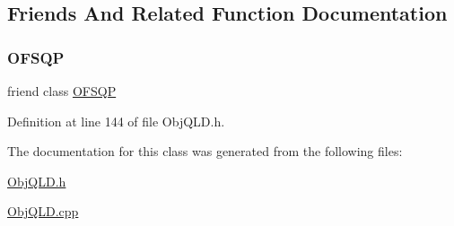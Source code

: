 \subsection{Friends And Related Function Documentation}
\hypertarget{classocra_1_1ObjQLD_a35ebfe61821cfb93672b26cc472c939e}{}\label{classocra_1_1ObjQLD_a35ebfe61821cfb93672b26cc472c939e} 
\subsubsection{\texorpdfstring{O\+F\+S\+QP}{OFSQP}}
{\footnotesize\ttfamily friend class \hyperlink{classocra_1_1OFSQP}{O\+F\+S\+QP}\hspace{0.3cm}{\ttfamily [friend]}}



Definition at line 144 of file Obj\+Q\+L\+D.\+h.



The documentation for this class was generated from the following files\+:\begin{DoxyCompactItemize}
\item 
\hyperlink{ObjQLD_8h}{Obj\+Q\+L\+D.\+h}\item 
\hyperlink{ObjQLD_8cpp}{Obj\+Q\+L\+D.\+cpp}\end{DoxyCompactItemize}
